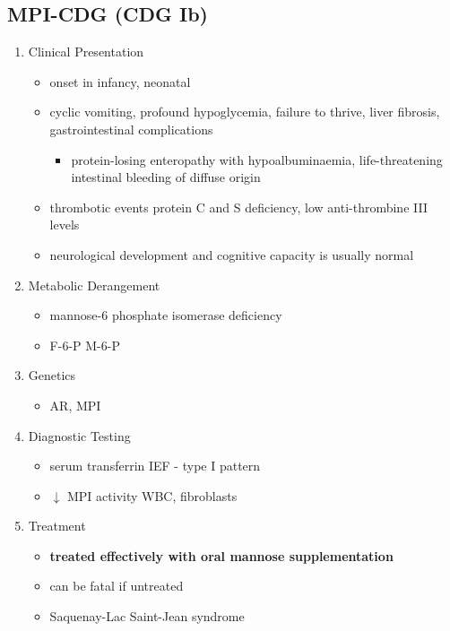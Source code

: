 \documentclass{scrartcl}
\begin{document}
\subsection{MPI-CDG (CDG Ib)}
\label{sec:org45d8b61}
\begin{enumerate}
\item Clinical Presentation
\label{sec:org9b0f080}
\begin{itemize}
\item onset in infancy, neonatal
\item cyclic vomiting, profound hypoglycemia, failure to thrive, liver
fibrosis, gastrointestinal complications
\begin{itemize}
\item protein-losing enteropathy with hypoalbuminaemia, life-threatening
intestinal bleeding of diffuse origin
\end{itemize}
\item thrombotic events protein C and S deficiency, low anti-thrombine III levels
\item neurological development and cognitive capacity is usually normal
\end{itemize}

\item Metabolic Derangement
\label{sec:org24cc34b}
\begin{itemize}
\item mannose-6 phosphate isomerase deficiency
\item F-6-P \ce{<=>} M-6-P
\end{itemize}

\item Genetics
\label{sec:orgc6b1426}
\begin{itemize}
\item AR, MPI
\end{itemize}

\item Diagnostic Testing
\label{sec:orgf68dd1a}
\begin{itemize}
\item serum transferrin IEF - type I pattern
\item \(\downarrow\) MPI activity WBC, fibroblasts
\end{itemize}

\item Treatment
\label{sec:org4aefaf2}
\begin{itemize}
\item \textbf{treated effectively with oral mannose supplementation}
\item can be fatal if untreated
\item Saquenay-Lac Saint-Jean syndrome
\end{itemize}
\end{enumerate}
\end{document}

